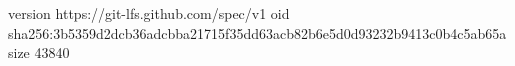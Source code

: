 version https://git-lfs.github.com/spec/v1
oid sha256:3b5359d2dcb36adcbba21715f35dd63acb82b6e5d0d93232b9413c0b4c5ab65a
size 43840
